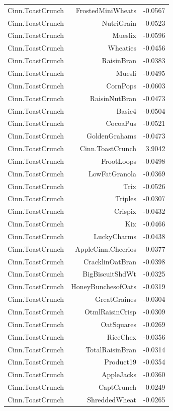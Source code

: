 \begin{longtable}{@{}lrr@{}}
Cinn.ToastCrunch & FrostedMiniWheats & -0.0567 \\
Cinn.ToastCrunch & NutriGrain & -0.0523 \\
Cinn.ToastCrunch & Mueslix & -0.0596 \\
Cinn.ToastCrunch & Wheaties & -0.0456 \\
Cinn.ToastCrunch & RaisinBran & -0.0383 \\
Cinn.ToastCrunch & Muesli & -0.0495 \\
Cinn.ToastCrunch & CornPops & -0.0603 \\
Cinn.ToastCrunch & RaisinNutBran & -0.0473 \\
Cinn.ToastCrunch & Basic4 & -0.0504 \\
Cinn.ToastCrunch & CocoaPus & -0.0521 \\
Cinn.ToastCrunch & GoldenGrahams & -0.0473 \\
Cinn.ToastCrunch & Cinn.ToastCrunch & 3.9042 \\
Cinn.ToastCrunch & FrootLoops & -0.0498 \\
Cinn.ToastCrunch & LowFatGranola & -0.0369 \\
Cinn.ToastCrunch & Trix & -0.0526 \\
Cinn.ToastCrunch & Triples & -0.0307 \\
Cinn.ToastCrunch & Crispix & -0.0432 \\
Cinn.ToastCrunch & Kix & -0.0466 \\
Cinn.ToastCrunch & LuckyCharms & -0.0438 \\
Cinn.ToastCrunch & AppleCinn.Cheerios & -0.0377 \\
Cinn.ToastCrunch & CracklinOatBran & -0.0398 \\
Cinn.ToastCrunch & BigBiscuitShdWt & -0.0325 \\
Cinn.ToastCrunch & HoneyBunchesofOats & -0.0319 \\
Cinn.ToastCrunch & GreatGraines & -0.0304 \\
Cinn.ToastCrunch & OtmlRaisinCrisp & -0.0309 \\
Cinn.ToastCrunch & OatSquares & -0.0269 \\
Cinn.ToastCrunch & RiceChex & -0.0356 \\
Cinn.ToastCrunch & TotalRaisinBran & -0.0314 \\
Cinn.ToastCrunch & Product19 & -0.0354 \\
Cinn.ToastCrunch & AppleJacks & -0.0360 \\
Cinn.ToastCrunch & CaptCrunch & -0.0249 \\
Cinn.ToastCrunch & ShreddedWheat & -0.0265 \\

\end{longtable}
